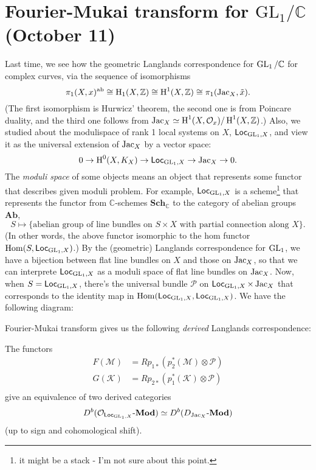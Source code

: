 \newpage
\section{Fourier-Mukai transform for $\mathrm{GL}_{1}/\mathbb{C}$ (October 11)}

Last time, we see how the geometric Langlands correspondence for $\operatorname{\mathrm{GL}}_1/\mathbb{C}$
for complex curves, via the sequence of isomorphisms
$$
\pi_1(X, x)^{\mathrm{ab}} \cong \operatorname{\mathrm{H}}_1(X, \mathbb{Z}) \cong \operatorname{\mathrm{H}}^{1}(X, \mathbb{Z}) \cong \pi_1(\operatorname{\mathrm{Jac}}_X, \tilde{x}).
$$
(The first isomorphism is Hurwicz' theorem, the second one is from Poincare duality, and the third one follows from
$\operatorname{\mathrm{Jac}}_X \simeq \operatorname{\mathrm{H}}^{1}(X, \mathcal{O}_x) / \operatorname{\mathrm{H}}^{1}(X,\mathbb{Z})$.)
Also, we studied about the modulispace of rank 1 local systems on $X$, $\operatorname{\mathsf{Loc}}_{\operatorname{\mathrm{GL}}_1, X}$, 
and view it as the universal extension of $\operatorname{\mathrm{Jac}}_X$ by a vector space:
$$
0 \to \operatorname{\mathrm{H}}^{0}(X, K_X) \to \operatorname{\mathsf{Loc}}_{\operatorname{\mathrm{GL}}_1, X} \to \operatorname{\mathrm{Jac}}_X \to 0.
$$
The \emph{moduli space} of some objects means an object that represents some functor that describes given moduli problem.
For example, $\operatorname{\mathsf{Loc}}_{\operatorname{\mathrm{GL}}_1, X}$ is a scheme\footnote{it might be a stack - I'm not sure about this point.} that represents the functor
from $\mathbb{C}$-schemes $\mathbf{Sch}_{\mathbb{C}}$ to the category of abelian groups $\mathbf{Ab}$,
$$
S \mapsto \{\text{abelian group of line bundles on }S \times X\text{ with partial connection along }X\}.
$$
(In other words, the above functor isomorphic to the hom functor $\mathrm{Hom}(S, \operatorname{\mathsf{Loc}}_{\operatorname{\mathrm{GL}}_1, X})$.)
By the (geometric) Langlands correspondence for $\operatorname{\mathrm{GL}}_1$, we have a bijection between
flat line bundles on $X$ and those on $\operatorname{\mathrm{Jac}}_X$, so that we can interprete $\operatorname{\mathsf{Loc}}_{\operatorname{\mathrm{GL}}_1, X}$ as a moduli space
of flat line bundles on $\operatorname{\mathrm{Jac}}_X$.
Now, when $S = \operatorname{\mathsf{Loc}}_{\operatorname{\mathrm{GL}}_1, X}$, there's the universal bundle $\mathcal{P}$ on $\operatorname{\mathsf{Loc}}_{\operatorname{\mathrm{GL}}_1, X} \times \operatorname{\mathrm{Jac}}_X$
that corresponds to the identity map in $\mathrm{Hom}(\operatorname{\mathsf{Loc}}_{\operatorname{\mathrm{GL}}_1, X}, \operatorname{\mathsf{Loc}}_{\operatorname{\mathrm{GL}}_1, X})$.
We have the following diagram:
\begin{center}
\end{center}
Fourier-Mukai transform gives us the following \emph{derived} Langlands correspondence:
\begin{theorem}
    The functors
    \begin{align*}
        F(\mathcal{M}) &= Rp_{1*}(p_{2}^{*}(\mathcal{M}) \otimes \mathcal{P}) \\
        G(\mathcal{K}) &= Rp_{2*}(p_{1}^{*}(\mathcal{K}) \otimes \mathcal{P}) \\
    \end{align*}
    give an equivalence of two derived categories
    $$
    D^{b}(\mathcal{O}_{\operatorname{\mathsf{Loc}}_{\operatorname{\mathrm{GL}}_1, X}}\text{-}\mathbf{Mod}) \simeq D^{b}(D_{\operatorname{\mathrm{Jac}}_X}\text{-}\mathbf{Mod})
    $$
    (up to sign and cohomological shift).
\end{theorem}
